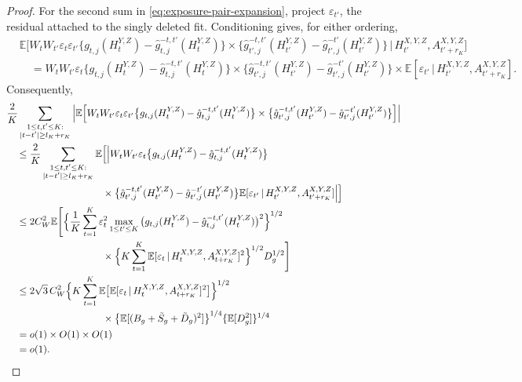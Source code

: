 \documentclass[12pt]{article}
\def\E{\mathbb{E}}
\newcommand\given{\,|\,}
\numberwithin{equation}{section}
\begin{document}
\begin{proof}
For the second sum in \eqref{eq:exposure-pair-expansion}, project
\(\varepsilon_{t'}\), the residual attached to the singly deleted fit.
Conditioning gives, for either ordering,
\begin{align*}
&\E\Big[
W_tW_{t'}\varepsilon_t\varepsilon_{t'}
\big\{g_{t,j}(H_t^{Y,Z})
      -\hat g_{t,j}^{-t,t'}(H_t^{Y,Z})\big\}
\times
\big\{\hat g_{t',j}^{-t,t'}(H_{t'}^{Y,Z})
      -\hat g_{t',j}^{-t'}(H_{t'}^{Y,Z})\big\}
\given H_{t'}^{X,Y,Z},A_{t'+r_K}^{X,Y,Z}
\Big]\\
&\quad=
W_tW_{t'}\varepsilon_t
\big\{g_{t,j}(H_t^{Y,Z})
      -\hat g_{t,j}^{-t,t'}(H_t^{Y,Z})\big\}
\times
\big\{\hat g_{t',j}^{-t,t'}(H_{t'}^{Y,Z})
      -\hat g_{t',j}^{-t'}(H_{t'}^{Y,Z})\big\}\times
\E[\varepsilon_{t'}\given
H_{t'}^{X,Y,Z},A_{t'+r_K}^{X,Y,Z}].
\end{align*}
Consequently,
\begin{align}
&\frac2K\sum_{\substack{1\leq t,t'\leq K:\\
                      |t-t'|\geq l_K+r_K}}
\Big|\E\Big[
W_tW_{t'}\varepsilon_t\varepsilon_{t'}
\big\{g_{t,j}(H_t^{Y,Z})
      -\hat g_{t,j}^{-t,t'}(H_t^{Y,Z})\big\}\times
\big\{\hat g_{t',j}^{-t,t'}(H_{t'}^{Y,Z})
      -\hat g_{t',j}^{-t'}(H_{t'}^{Y,Z})\big\}
\Big]\Big|\notag\\
&\quad\leq
\frac2K\sum_{\substack{1\leq t,t'\leq K:\\
                      |t-t'|\geq l_K+r_K}}
\E\Big[\Big|
W_tW_{t'}\varepsilon_t
\big\{g_{t,j}(H_t^{Y,Z})
      -\hat g_{t,j}^{-t,t'}(H_t^{Y,Z})\big\}\notag\\*
&\hspace{34mm}{}\times
\big\{\hat g_{t',j}^{-t,t'}(H_{t'}^{Y,Z})
      -\hat g_{t',j}^{-t'}(H_{t'}^{Y,Z})\big\}
\E[\varepsilon_{t'}\given
H_{t'}^{X,Y,Z},A_{t'+r_K}^{X,Y,Z}]
\Big|\Big]\notag\\
&\quad\leq2C_W^2\E\Bigg[
\Big\{\frac1K\sum_{t=1}^K\varepsilon_t^2
\max_{1\leq t'\leq K}
\big(g_{t,j}(H_t^{Y,Z})
     -\hat g_{t,j}^{-t,t'}(H_t^{Y,Z})\big)^2
\Big\}^{1/2}\notag\\*
&\hspace{34mm}{}\times
\Big\{K\sum_{t=1}^K
\E[\varepsilon_t\given
H_t^{X,Y,Z},A_{t+r_K}^{X,Y,Z}]^2
\Big\}^{1/2}D_g^{1/2}
\Bigg]\notag\\
&\quad\leq2\sqrt3\,C_W^2
\Big\{K\sum_{t=1}^K
\E\big[
\E[\varepsilon_t\given
H_t^{X,Y,Z},A_{t+r_K}^{X,Y,Z}]^2
\big]\Big\}^{1/2}\notag\\*
&\hspace{34mm}{}\times
\big\{\E[(B_g+\tilde S_g+\tilde D_g)^2]\big\}^{1/4}
\{\E[D_g^2]\}^{1/4}\notag\\
&\quad=o(1)\times O(1)\times O(1)\notag\\
&\quad=o(1).
\label{eq:exposure-mixed-bound}
\end{align}


\end{proof}
\end{document}
